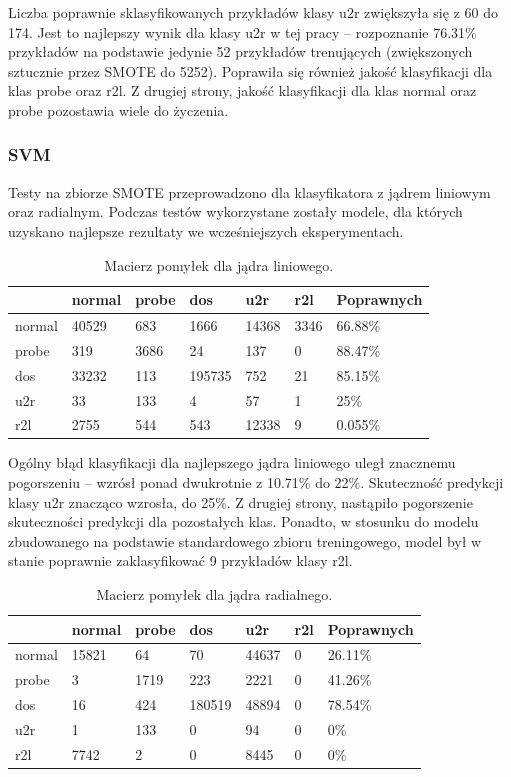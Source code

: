 \documentclass[a4paper, 12pt]{article}
\begin{document}
Liczba poprawnie sklasyfikowanych przykładów klasy u2r zwiększyła się z 60 do 174.
Jest to najlepszy wynik dla klasy u2r w tej pracy -- rozpoznanie 76.31\% przykładów
na podstawie jedynie 52 przykładów trenujących (zwiększonych sztucznie przez SMOTE do 5252).
Poprawiła się również jakość klasyfikacji dla klas probe oraz r2l. Z drugiej strony, jakość
klasyfikacji dla klas normal oraz probe pozostawia wiele do życzenia.

\subsubsection{SVM}
Testy na zbiorze SMOTE przeprowadzono dla klasyfikatora z jądrem liniowym oraz radialnym. Podczas testów wykorzystane zostały modele, dla których uzyskano najlepsze rezultaty we wcześniejszych eksperymentach.

\begin{table}[H]
\centering
\begin{tabular}{ | l | l | l | l | l | l | l | } \hline
	& normal & probe & dos 	& u2r 	& r2l 	& Poprawnych	\\ \hline
normal &  40529 &  683  & 1666 &  14368 & 3346 & 66.88\% \\ \hline
probe  &    319 &  3686 &     24  &   137 &    0 & 88.47\% \\ \hline
dos    &  33232 &   113 & 195735  &  752  &  21 & 85.15\% \\ \hline
u2r    &     33 &  133  &     4   &  57   &  1 & 25\% \\ \hline
r2l    &   2755 &   544 &    543 &  12338 &  9 & 0.055\% \\ \hline
\end{tabular} 
\caption{Macierz pomyłek dla jądra liniowego.}
\end{table}

Ogólny błąd klasyfikacji dla najlepszego jądra liniowego uległ znacznemu pogorszeniu -- wzrósł ponad dwukrotnie z 10.71\% do 22\%. Skuteczność predykcji klasy u2r znacząco wzrosła, do 25\%. Z drugiej strony, nastąpiło pogorszenie skuteczności predykcji dla pozostałych klas. Ponadto, w stosunku do modelu zbudowanego na podstawie standardowego zbioru treningowego, model był w stanie poprawnie zaklasyfikować 9 przykładów klasy r2l.

\begin{table}[H]
\centering
\begin{tabular}{ | l | l | l | l | l | l | l | } \hline
	& normal & probe & dos 	& u2r 	& r2l 	& Poprawnych	\\ \hline
normal & 15821 &   64  &   70 & 44637 &  0 & 26.11\% \\ \hline
probe  &    3 &  1719  &  223 &  2221 &  0  & 41.26\% \\ \hline
dos    &    16  & 424 & 180519 & 48894 & 0  & 78.54\% \\ \hline
u2r    &     1  & 133   &   0  &  94 &  0 & 0\% \\ \hline
r2l    &  7742  &   2  &   0 & 8445 &  0 & 0\% \\ \hline
\end{tabular} 
\caption{Macierz pomyłek dla jądra radialnego.}
\end{table}
\end{document}

